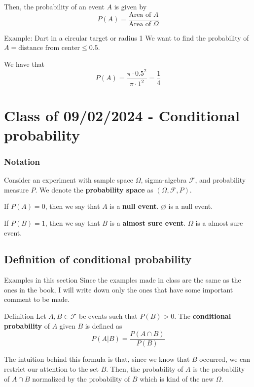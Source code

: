 \documentclass[10pt]{extarticle}
\newcommand{\F}{\mathcal{F}}
\begin{document}
Then, the probability of an event $A$ is given by
$$
    P(A) = \frac{\text{Area of } A}{\text{Area of } \Omega}
$$

\begin{examplebox}{Example: Dart in a circular target or radius 1}
    We want to find the probability of $A = \text{distance from center} \leq 0.5$.

    We have that
    $$
        P(A) = \frac{\pi \cdot 0.5^2}{\pi \cdot 1^2} = \frac{1}{4}
    $$
\end{examplebox}

\section{Class of 09/02/2024 - Conditional probability}

\subsubsection{Notation}


Consider an experiment with sample space $\Omega$, sigma-algebra $\F$, and probability measure $P$.
We denote the \textbf{probability space} as $(\Omega, \F, P)$.

If $P(A) = 0$, then we say that $A$ is a \textbf{null event}.
$\varnothing$ is a null event.

If $P(B) = 1$, then we say that $B$ is a \textbf{almost sure event}.
$\Omega$ is a almost sure event.

\subsection{Definition of conditional probability}

\begin{warningbox}{Examples in this section}
    Since the examples made in class are the same as the ones in the book,
    I will write down only the ones that have some important comment to be made.
\end{warningbox}

\begin{notebox}{Definition}
    Let $A, B \in \F$ be events such that $P(B) > 0$.
    The \textbf{conditional probability} of $A$ given $B$ is defined as
    $$
        P(A|B) = \frac{P(A \cap B)}{P(B)}
    $$
\end{notebox}

The intuition behind this formula is that, since we know that $B$ occurred, we can restrict our attention to the set $B$.
Then, the probability of $A$ is the probability of $A \cap B$ normalized by the probability of $B$ which is kind of the new $\Omega$.
\end{document}
